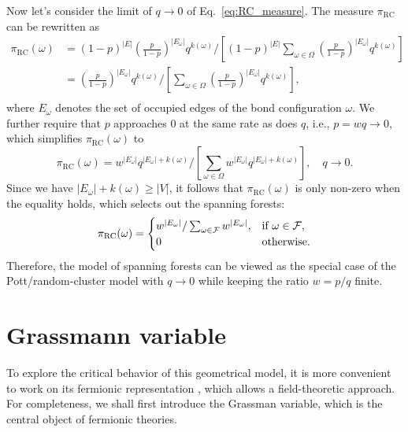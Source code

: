 Now let's consider the limit of $q\to 0$ of Eq.~\eqref{eq:RC_measure}. The measure $\pi_{\text{RC}}$ can be rewritten as
\begin{equation}
	\begin{aligned}
	\pi_{\text{RC}}(\omega) &= (1-p)^{|E|}(\frac{p}{1-p})^{|E_\omega|}q^{k(\omega)}\Bigg/\left[(1-p)^{|E|}\sum_{\omega \in \Omega}(\frac{p}{1-p})^{|E_\omega|}q^{k(\omega)}\right]\\
	&= (\frac{p}{1-p})^{|E_\omega|}q^{k(\omega)}\Bigg/\left[\sum_{\omega \in \Omega}(\frac{p}{1-p})^{|E_\omega|}q^{k(\omega)}\right],\\
	\end{aligned}
\end{equation}
where $E_\omega$ denotes the set of occupied edges of the bond configuration $\omega$. We further require that $p$ approaches 0 at the same rate as does $q$, i.e., $p = w q \to 0$, which simplifies $\pi_{\text{RC}}(\omega)$ to
\begin{equation}
	\pi_{\text{RC}}(\omega) = w^{|E_\omega|}q^{|E_\omega| + k(\omega)}\Bigg/\left[\sum_{\omega \in \Omega}w^{|E_\omega|}q^{|E_\omega| + k(\omega)}\right], \quad q \to 0.
\end{equation}
Since we have $|E_\omega| + k(\omega) \geq |V|$, it follows that $\pi_{\text{RC}}(\omega)$ is only non-zero
when the equality holds, which selects out the spanning forests:
\begin{equation}
	\pi_{\text{RC}}(\omega) =
	\begin{cases}
	 w^{|E_\omega|}/\sum_{\omega \in {\mathcal F}}w^{|E_\omega|}, &\text{if}\ \omega \in {\mathcal F}, \\
	 0 &\text{otherwise}.
	\end{cases}
\end{equation}
Therefore, the model of spanning forests can be viewed as the special case of the Pott/random-cluster model with 
$q \to 0$ while keeping the ratio $w = p/q$ finite. 

\section{Grassmann variable}
To explore the critical behavior of this geometrical model, it is more convenient to work on its fermionic representation \cite{Caracciolo2004}, 
which allows a field-theoretic approach. For completeness, we shall first introduce the Grassman variable, which is the central object
of fermionic theories. 

